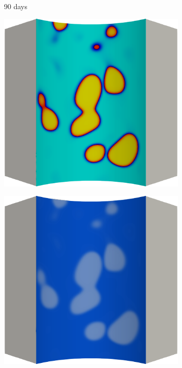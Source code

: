 \begin{figure}[!htbp]
  \begin{subfigure}{0.15\textwidth}
    \centering
    \caption*{90 days}
  \end{subfigure}
  \begin{subfigure}{0.19\textwidth}
    \centering
    \includegraphics[width=\textwidth]{Chapter5/figures/spallation/c.0009}
  \end{subfigure}
  \hspace{0.06\textwidth}
  \begin{subfigure}{0.19\textwidth}
    \centering
    \includegraphics[width=\textwidth]{Chapter5/figures/spallation/d.0009}

\end{subfigure}
\end{figure}
